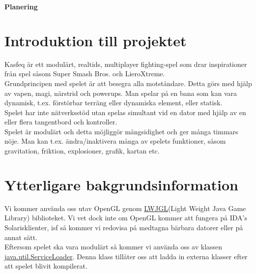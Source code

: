 \begin{center}
   \textbf{\Huge Planering}\\[1cm]
\end{center}
\section{Introduktion till projektet}
Kasfeq är ett modulärt, realtids, multiplayer fighting-spel som drar inspirationer från spel såsom Super Smash Bros. och LieroXtreme.\\
Grundprincipen med spelet är att besegra alla motståndare. Detta görs med hjälp av vapen, magi, närstrid och powerups. Man spelar på en bana som kan vara dynamisk, t.ex. förstörbar terräng eller dynamiska element, eller statisk.\\
\vspace{11pt}
Spelet har inte nätverksstöd utan spelas simultant vid en dator med hjälp av en eller flera tangentbord och kontroller.\\
\vspace{11pt}
Spelet är modulärt och detta möjliggör mångsidighet och ger många timmars nöje. Man kan t.ex. ändra/inaktivera många av spelets funktioner, såsom gravitation, friktion, explosioner, grafik, kartan etc.\\

\section{Ytterligare bakgrundsinformation}
Vi kommer använda oss utav OpenGL genom \href{http://www.lwjgl.org/}{LWJGL}(Light Weight Java Game Library) biblioteket. Vi vet dock inte om OpenGL kommer att fungera på IDA's Solarisklienter, isf så kommer vi redovisa på medtagna bärbara datorer eller på annat sätt.\\
\vspace{11pt}
Eftersom spelet ska vara modulärt så kommer vi använda oss av klassen \href{http://docs.oracle.com/javase/6/docs/api/java/util/ServiceLoader.html}{java.util.ServiceLoader}. Denna klass tillåter oss att ladda in externa klasser efter att spelet blivit kompilerat.\\
